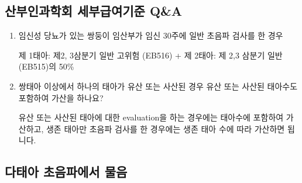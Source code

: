 \subsection{산부인과학회 세부급여기준 Q\&A}
\begin{enumerate}\tightlist
{} 가산에 해당하지 않는 쌍둥이 임산부가 임신 30주에 일반 초음파 검사를 한 경우 \par
제 1태아: 제2, 3삼분기 일반 (EB515) + 제 2태아: 제 2,3 삼분기 일반 (EB515)의 50\%
\item 임신성 당뇨가 있는 쌍둥이 임산부가 임신 30주에 일반 초음파 검사를 한 경우 \par
제 1태아: 제2, 3삼분기 일반 고위험 (EB516) + 제 2태아: 제 2,3 삼분기 일반 (EB515)의 50\%
\item 쌍태아 이상에서 하나의 태아가 유산 또는 사산된 경우 유산 또는 사산된 태아수도 포함하여 가산을 하나요?\par
유산 또는 사산된 태아에 대한 evaluation을 하는 경우에는 태아수에 포함하여 가산하고, 생존 태아만 초음파 검사를 한 경우에는 생존 태아 수에 따라 가산하면 됩니다.
\end{enumerate}
\prezi{\clearpage}
\subsection{다태아 초음파에서 물음}

